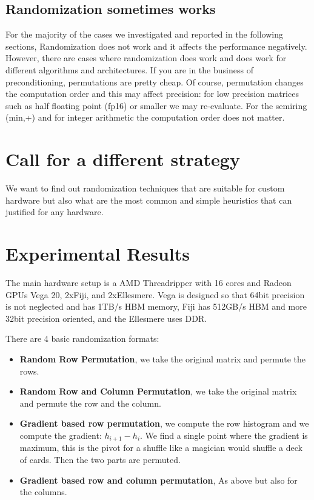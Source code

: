 \documentclass[manuscript,screen]{acmart}
\begin{document}
\subsection{Randomization sometimes works}

For the majority of the cases we investigated and reported in the
following sections, Randomization does not work and it affects the
performance negatively. However, there are cases where randomization
does work and does work for different algorithms and architectures. If
you are in the business of preconditioning, permutations are pretty
cheap. Of course, permutation changes the computation order and this
may affect precision: for low precision matrices such as half floating
point (fp16) or smaller we may re-evaluate. For the semiring (min,+)
and for integer arithmetic the computation order does not matter.



\section{Call for a different strategy}
\label{sec:strategy}
We want to find out randomization techniques that are suitable for
custom hardware but also what are the most common and simple
heuristics that can justified for any hardware.


\section{Experimental Results}
\label{sec:experimentalresults}
The main hardware setup is a AMD Threadripper with 16 cores and Radeon
GPUs Vega 20, 2xFiji, and 2xEllesmere. Vega is designed so that 64bit
precision is not neglected and has 1TB/s HBM memory, Fiji has 512GB/s
HBM and more 32bit precision oriented, and the Ellesmere uses DDR.

There are 4 basic randomization formats:
\begin{itemize}
  \item {\bf Random Row Permutation}, we take the original matrix and
    permute the rows.
  \item {\bf Random Row and Column Permutation}, we take the original
    matrix and permute the row and the column.
  \item {\bf Gradient based row permutation}, we compute the row
    histogram and we compute the gradient: $h_{i+1} - h_i$. We find a
    single point where the gradient is maximum, this is the pivot for
    a shuffle like a magician would shuffle a deck of cards.  Then the
    two parts are permuted.
  \item {\bf Gradient based row and column permutation}, As above but
    also for the columns.
\end{itemize}
\end{document}
